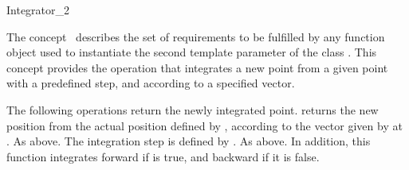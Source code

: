 

\begin{ccRefFunctionObjectConcept}{Integrator_2}


\ccDefinition
  
The concept \ccRefName\ describes the set of requirements to be
fulfilled by any function object used to instantiate the second
template parameter of the class
.  This concept
provides the operation that integrates a new point from a given point
with a predefined step, and according to a specified vector.

\ccTypes
{}
\ccGlue
{}
\ccGlue
{}
\ccGlue
{}
\ccGlue

\ccCreation
{}  %
\ccGlue

\ccOperations
{}
The following operations return the newly integrated point.
{returns the new position from the actual position defined by , according to the vector given by  at .
}
{As above. The integration step is defined by .
}
{As above. In addition, this function integrates forward if  is true, and backward if it is false.
}

\ccHasModels
{} \\
 \\
\end{ccRefFunctionObjectConcept}


